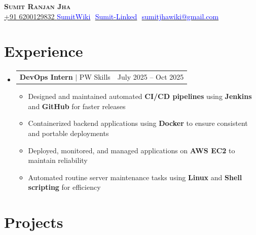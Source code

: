 \documentclass[letterpaper,11pt]{article}
\makeatletter
\newcommand{\resumeProjectHeading}[2]{
\item
\begin{tabular*}{0.97\textwidth}{l@{\extracolsep{\fill}}r}
\small#1 & #2 \\
\end{tabular*}\vspace{-7pt}
}
\newcommand{\resumeSubHeadingListStart}{\begin{itemize}[leftmargin=0.15in, label={}]}
\newcommand{\resumeSubHeadingListEnd}{\end{itemize}}
\makeatother
\begin{document}
\begin{flushright}
\color{gray}
\item
\end{flushright}

\vspace{-5pt}
\begin{center}
\textbf{\Huge \scshape Sumit Ranjan Jha} \\ \vspace{8pt}
\small
\href{}{+91 6200129832 }
\href{https://github.com/SumitWiki}{ \textcolor{blue}{ SumitWiki}} $ $
\href{https://www.linkedin.com/in/Sumit-Linked}{ \textcolor{blue}{  Sumit-Linked}} $ $
\href{mailto:shivamkumarsaitm@gmail.com}{ \textcolor{blue}{ sumitjhawiki@gmail.com}}

\end{center}


\section{Experience}

\resumeSubHeadingListStart
\resumeProjectHeading
{\large\textbf{DevOps Intern} $|$ PW Skills}{July 2025 -- Oct 2025}

\begin{itemize}
    \item Designed and maintained automated \textbf{CI/CD pipelines} using \textbf{Jenkins} and \textbf{GitHub} for faster releases
    \item Containerized backend applications using \textbf{Docker} to ensure consistent and portable deployments
    \item Deployed, monitored, and managed applications on \textbf{AWS EC2} to maintain reliability
    \item Automated routine server maintenance tasks using \textbf{Linux} and \textbf{Shell scripting} for efficiency
\end{itemize}






\resumeSubHeadingListEnd



\section{Projects}
\end{document}

